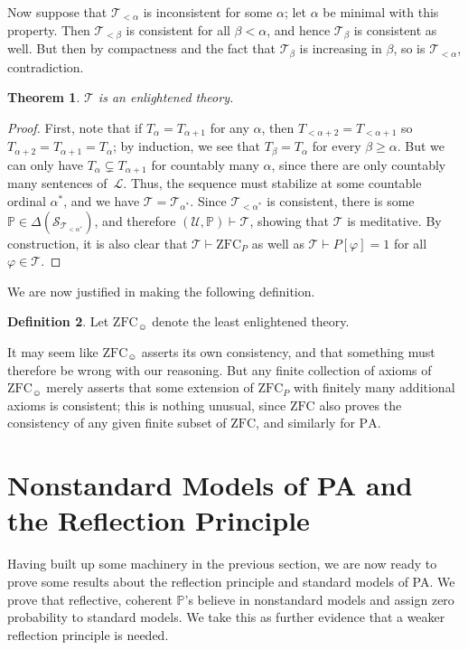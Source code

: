 \documentclass[12pt]{article}
\newcommand{\PP}{\mathbb{P}}
\newcommand{\vp}{\varphi}
\newcommand{\zfc}{\mathrm{ZFC}}
\newcommand{\zfcp}{{\zfc_P}}
\newcommand{\zfch}{{\zfc_{\smiley}}}
\newcommand{\pa}{\mathrm{PA}}
\newcommand{\cL}{\mathcal{L}}
\newcommand{\cS}{\mathcal{S}}
\newcommand{\cT}{\mathcal{T}}
\newcommand{\cU}{\mathcal{U}}
\theoremstyle{plain}
\newtheorem{theorem}{Theorem}[subsection]
\theoremstyle{definition}
\newtheorem{definition}[theorem]{Definition}
\theoremstyle{remark}
\begin{document}
Now suppose that $\cT_{<\alpha}$ is inconsistent for some $\alpha$; let $\alpha$ be minimal with this property. Then $\cT_{<\beta}$ is consistent for all $\beta<\alpha$, and hence $\cT_\beta$ is consistent as well. But then by compactness and the fact that $\cT_\beta$ is increasing in $\beta$, so is $\cT_{<\alpha}$, contradiction.
\begin{theorem}
$\cT$ is an enlightened theory.
\end{theorem}
\begin{proof}
First, note that if $T_{\alpha}= T_{\alpha+1}$ for any $\alpha$, then $T_{<\alpha+2} = T_{<\alpha+1}$ so $T_{\alpha+2} = T_{\alpha+1} = T_\alpha$; by induction, we see that $T_\beta = T_\alpha$ for every $\beta\ge\alpha$. But we can only have $T_{\alpha}\subsetneq T_{\alpha+1}$ for countably many $\alpha$, since there are only countably many sentences of~$\cL$. Thus, the sequence must stabilize at some countable ordinal $\alpha^*$, and we have $\cT = \cT_{\alpha^*}$. Since $\cT_{<\alpha^*}$ is consistent, there is some $\PP\in\Delta(\cS_{\cT_{<\alpha^*}})$, and therefore $(\cU,\PP)\vdash\cT$, showing that $\cT$ is meditative. By construction, it is also clear that $\cT\vdash\zfcp$ as well as $\cT\vdash P[\vp]=1$ for all $\vp\in\cT$.
\end{proof}
We are now justified in making the following definition.
\begin{definition}
Let $\zfch$ denote the least enlightened theory.
\end{definition}
It may seem like $\zfch$ asserts its own consistency, and that something must therefore be wrong with our reasoning. But any finite collection of axioms of $\zfch$ merely asserts that some extension of $\zfcp$ with finitely many additional axioms is consistent; this is nothing unusual, since $\zfc$ also proves the consistency of any given finite subset of $\zfc$, and similarly for $\pa$.
\section{Nonstandard Models of PA and the Reflection Principle}
\label{nonstandard-models}
Having built up some machinery in the previous section, we are now ready to prove some results about the reflection principle and standard models of PA. We prove that reflective, coherent $\PP$'s believe in nonstandard models and assign zero probability to standard models. We take this as further evidence that a weaker reflection principle is needed.
\end{document}
